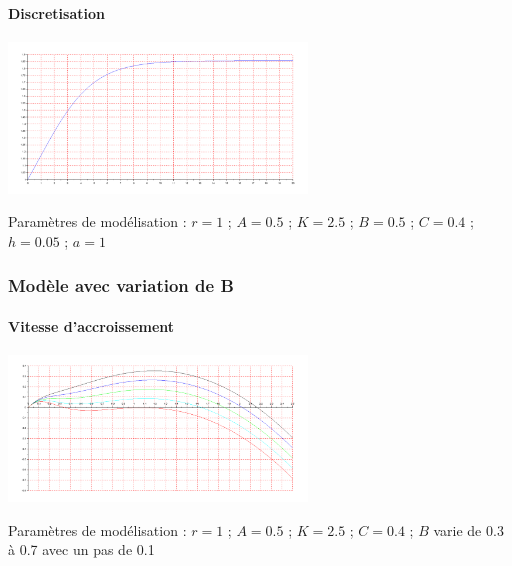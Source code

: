 \documentclass{article}
\begin{document}
\paragraph{}


\paragraph{Discretisation}
\begin{center}
\includegraphics[width=300px]{img/part2/Traj.png}
\end{center}
Paramètres de modélisation : $r=1$ ; $A=0.5$ ; $K=2.5$ ; $B=0.5$ ; $C=0.4$ ; $h=0.05$ ; $a=1$
\paragraph{}

\subsubsection{Modèle avec variation de B}

\paragraph{Vitesse d'accroissement}
\begin{center}
\includegraphics[width=300px]{img/part2/LogB.png}
\end{center}
Paramètres de modélisation : $r=1$ ; $A=0.5$ ; $K=2.5$ ; $C=0.4$ ; $B$ varie de 0.3 à 0.7 avec un pas de 0.1
\paragraph{}
\end{document}
